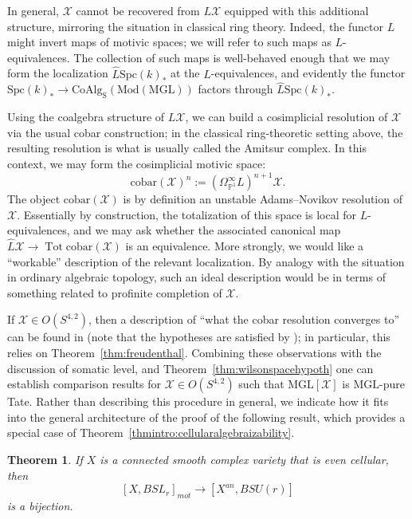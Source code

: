 \documentclass[11pt,leqno]{article}
\newcommand{\pone}{{\mathbb P}^1}
\renewcommand{\1}{{\rm 1\hspace*{-0.4ex}%
\rule{0.1ex}{1.52ex}\hspace*{0.2ex}}}
\newcommand{\Spc}{\mathrm{Spc}}
\newcommand{\<}[1]{{\langle}#1 {\rangle}}
\newcounter{intro}
\theoremstyle{plain}
\newtheorem{theorem}{Theorem}[subsection]
\theoremstyle{definition}
\theoremstyle{remark}
\numberwithin{equation}{subsection}
\begin{document}
In general, $\mathscr{X}$ cannot be recovered from $L\mathscr{X}$ equipped with this additional structure, mirroring the situation in classical ring theory.   Indeed, the functor $L$ might invert maps of motivic spaces; we will refer to such maps as $L$-equivalences.  The collection of such maps is well-behaved enough that we may form the localization $\hat{L}\Spc(k)_*$ at the $L$-equivalences, and evidently the functor $\Spc(k)_* \to \mathrm{CoAlg}_{\mathrm{S}}(\mathrm{Mod}(\mathrm{MGL}))$ factors through $\hat{L}\Spc(k)_*$.

Using the coalgebra structure of $L\mathscr{X}$, we can build a cosimplicial resolution of $\mathscr{X}$ via the usual cobar construction; in the classical ring-theoretic setting above, the resulting resolution is what is usually called the Amitsur complex.  In this context, we may form the cosimplicial motivic space:
\[
\mathrm{cobar}(\mathscr{X})^n := (\Omega^{\infty}_{\pone}L)^{n+1} \mathscr{X}.
\]
The object $\mathrm{cobar}(\mathscr{X})$ is by definition an unstable Adams--Novikov resolution of $\mathscr{X}$.  Essentially by construction, the totalization of this space is local for $L$-equivalences, and we may ask whether the associated canonical map $\hat{L}\mathscr{X} \to \operatorname{Tot} \mathrm{cobar}(\mathscr{X})$ is an equivalence.  More strongly, we would like a ``workable'' description of the relevant localization.  By analogy with the situation in ordinary algebraic topology, such an ideal description would be in terms of something related to profinite completion of $\mathscr{X}$.  

If $\mathscr{X} \in O(S^{4,2})$, then a description of ``what the cobar resolution converges to'' can be found in \cite[Theorem 6.51(2)]{BachmannEngelmannMattis2025Monadic} (note that the hypotheses are satisfied by \cite[Definition 6.32, Remark 6.33]{BachmannEngelmannMattis2025Monadic}); in particular, this relies on Theorem~\ref{thm:freudenthal}.  Combining these observations with the discussion of somatic level, and Theorem~\ref{thm:wilsonspacehypoth} one can establish comparison results for $\mathscr{X} \in O(S^{4,2})$ such that $\mathrm{MGL}[\mathscr{X}]$ is $\mathrm{MGL}$-pure Tate.  Rather than describing this procedure in general, we indicate how it fits into the general architecture of the proof of the following result, which provides a special case of Theorem~\ref{thmintro:cellularalgebraizability}.  

\begin{theorem}
	\label{thm:vbtrivdet}
	If $X$ is a connected smooth complex variety that is even cellular, then
	\[
	[X,BSL_r]_{mot} \longrightarrow [X^{an},BSU(r)]
	\]
	is a bijection.
\end{theorem}
\end{document}
